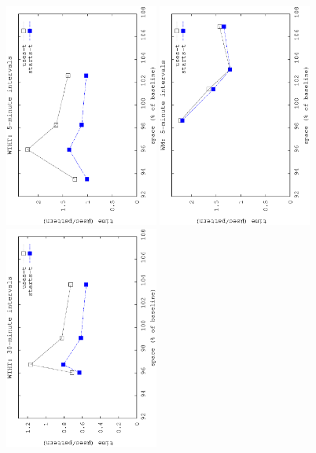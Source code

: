 \begin{figure}[!ht]
		\begin{center}
				{\includegraphics[angle=-90,width=0.45\textwidth]{figures_synt/porto_t5mht.eps}}
				{\includegraphics[angle=-90,width=0.45\textwidth]{figures_synt/porto_t5mwm.eps}}
				{\includegraphics[angle=-90,width=0.45\textwidth]{figures_synt/porto_t30mht.eps}}

\end{center}
\end{figure}
